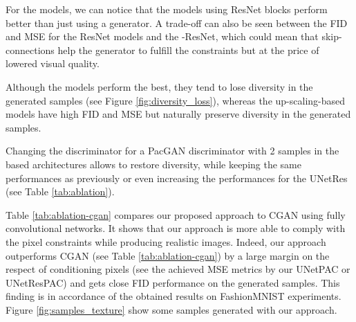 For the  models, we can notice that the models using ResNet blocks perform better than just using a  generator. A trade-off can also be seen between the FID and MSE for the ResNet models and the -ResNet, which could mean that skip-connections help the generator to fulfill the constraints but at the price of lowered visual quality.

Although the  models perform the best, they tend to lose diversity in the generated samples (see Figure \ref{fig:diversity_loss}), whereas the up-scaling-based models have high FID and MSE but naturally preserve diversity in the generated samples.

Changing the discriminator for a PacGAN discriminator with 2 samples in the  based architectures allows to restore diversity, while keeping the same performances as previously or even increasing the performances for the UNetRes (see Table \ref{tab:ablation}).

Table \ref{tab:ablation-cgan} compares our proposed approach to CGAN using fully convolutional networks. It shows that our approach is more able to comply with the pixel constraints while producing realistic images. Indeed, our approach outperforms CGAN (see Table \ref{tab:ablation-cgan}) by a large margin on the respect of conditioning pixels (see the achieved MSE metrics by  our UNetPAC or UNetResPAC)  and gets  close FID performance on the generated samples. This finding is in accordance of the obtained results on FashionMNIST experiments. Figure \ref{fig:samples_texture} show some samples generated with our approach.

